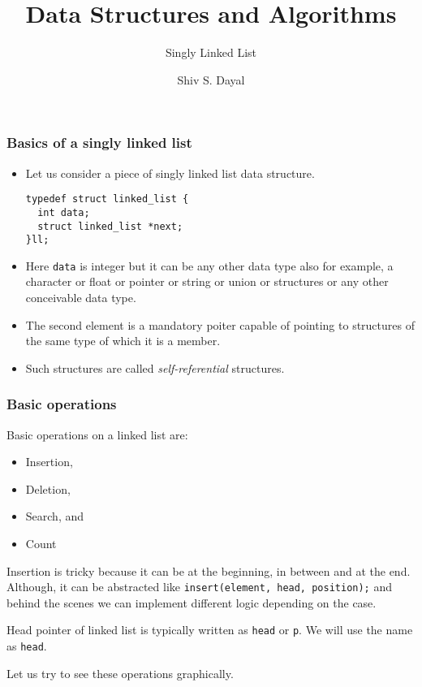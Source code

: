 \documentclass[aspectratio=1610]{beamer}
\begin{document}
\begin{frame}
\title{Data Structures and Algorithms}
\subtitle{Singly Linked List}
\author{Shiv S. Dayal}
\titlepage
\end{frame}

\begin{frame}[fragile]
\frametitle{Basics of a singly linked list}
\begin{itemize}
\item Let us consider a piece of singly linked list data structure.
\begin{verbatim}
typedef struct linked_list {
  int data;
  struct linked_list *next;
}ll;
\end{verbatim}
\item Here \texttt{data} is integer but it can be any other data type
also for example, a character or float or pointer or string or
union or structures or any other conceivable data type.
\item The second element is a mandatory poiter capable of pointing to
structures of the same type of which it is a member.
\item Such structures are called \textit{self-referential} structures.
\end{itemize}
\end{frame}

\begin{frame}
\frametitle{Basic operations}
Basic operations on a linked list are:
\begin{itemize}
\item Insertion,
\item Deletion,
\item Search, and
\item Count
\end{itemize}
Insertion is tricky because it can be at the beginning, in
between and at the end. Although, it can be abstracted like
\texttt{insert(element, head, position);} and behind the
scenes we can implement different logic depending on the case.

Head pointer of linked list is typically written as \texttt{head}
or \texttt{p}. We will use the name as \texttt{head}.

Let us try to see these operations graphically.
\end{frame}
\end{document}
